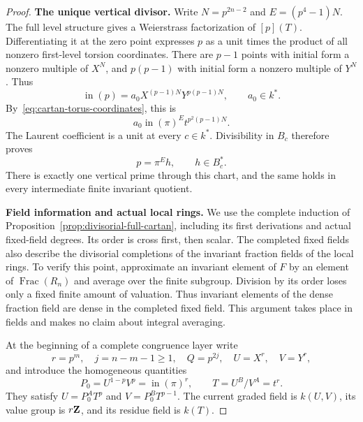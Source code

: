 \begin{proof}
\par\medskip\noindent\textbf{The unique vertical divisor.}\enspace
Write $N=p^{2n-2}$ and $E=(p^4-1)N$. The full level structure gives a Weierstrass factorization of $[p](T)$. Differentiating it at the zero point expresses $p$ as a unit times the product of all nonzero first-level torsion coordinates. There are $p-1$ points with initial form a nonzero multiple of $X^N$, and $p(p-1)$ with initial form a nonzero multiple of $Y^N$. Thus
\[
 \operatorname{in}(p)=a_0X^{(p-1)N}Y^{p(p-1)N},
 \qquad a_0\in k^*.
\]
By~\eqref{eq:cartan-torus-coordinates}, this is
\[
 a_0\operatorname{in}(\pi)^E t^{p^2(p-1)N}.
\]
The Laurent coefficient is a unit at every $c\in k^*$. Divisibility in $B_c$ therefore proves
\begin{equation}\label{eq:cartan-torus-upstairs-unit}
 p=\pi^E h,\qquad h\in B_c^*.
\end{equation}
There is exactly one vertical prime through this chart, and the same holds in every intermediate finite invariant quotient.

\par\medskip\noindent\textbf{Field information and actual local rings.}\enspace
We use the complete induction of Proposition~\ref{prop:divisorial-full-cartan}, including its first derivations and actual fixed-field degrees. Its order is cross first, then scalar. The completed fixed fields also describe the divisorial completions of the invariant fraction fields of the local rings. To verify this point, approximate an invariant element of $F$ by an element of $\operatorname{Frac}(R_n)$ and average over the finite subgroup. Division by its order loses only a fixed finite amount of valuation. Thus invariant elements of the dense fraction field are dense in the completed fixed field. This argument takes place in fields and makes no claim about integral averaging.

At the beginning of a complete congruence layer write
\[
 r=p^m,\quad j=n-m-1\ge1,\quad Q=p^{2j},\quad
 U=X^r,\quad V=Y^r,
\]
and introduce the homogeneous quantities
\begin{equation}\label{eq:cartan-torus-layer-coordinates}
 P_0=U^{1-p}V^p=\operatorname{in}(\pi)^r,
 \qquad T=U^B/V^A=t^r.
\end{equation}
They satisfy $U=P_0^A T^p$ and $V=P_0^B T^{p-1}$. The current graded field is $k(U,V)$, its value group is $r\mathbf Z$, and its residue field is $k(T)$.


\end{proof}
